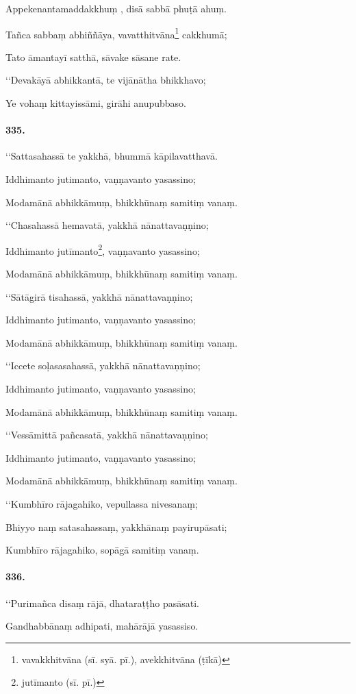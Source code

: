 Appekenantamaddakkhuṃ , disā sabbā phuṭā ahuṃ.

Tañca sabbaṃ abhiññāya, vavatthitvāna\footnote{vavakkhitvāna (sī. syā. pī.), avekkhitvāna (ṭīkā)} cakkhumā;

Tato āmantayī satthā, sāvake sāsane rate.

‘‘Devakāyā abhikkantā, te vijānātha bhikkhavo;

Ye vohaṃ kittayissāmi, girāhi anupubbaso.

\paragraph{335.}‘‘Sattasahassā te yakkhā, bhummā kāpilavatthavā.

Iddhimanto jutimanto, vaṇṇavanto yasassino;

Modamānā abhikkāmuṃ, bhikkhūnaṃ samitiṃ vanaṃ.

‘‘Chasahassā hemavatā, yakkhā nānattavaṇṇino;

Iddhimanto jutīmanto\footnote{jutīmanto (sī. pī.)}, vaṇṇavanto yasassino;

Modamānā abhikkāmuṃ, bhikkhūnaṃ samitiṃ vanaṃ.

‘‘Sātāgirā tisahassā, yakkhā nānattavaṇṇino;

Iddhimanto jutimanto, vaṇṇavanto yasassino;

Modamānā abhikkāmuṃ, bhikkhūnaṃ samitiṃ vanaṃ.

‘‘Iccete soḷasasahassā, yakkhā nānattavaṇṇino;

Iddhimanto jutimanto, vaṇṇavanto yasassino;

Modamānā abhikkāmuṃ, bhikkhūnaṃ samitiṃ vanaṃ.

‘‘Vessāmittā pañcasatā, yakkhā nānattavaṇṇino;

Iddhimanto jutimanto, vaṇṇavanto yasassino;

Modamānā abhikkāmuṃ, bhikkhūnaṃ samitiṃ vanaṃ.

‘‘Kumbhīro rājagahiko, vepullassa nivesanaṃ;

Bhiyyo naṃ satasahassaṃ, yakkhānaṃ payirupāsati;

Kumbhīro rājagahiko, sopāgā samitiṃ vanaṃ.

\paragraph{336.}‘‘Purimañca disaṃ rājā, dhataraṭṭho pasāsati.

Gandhabbānaṃ adhipati, mahārājā yasassiso.

